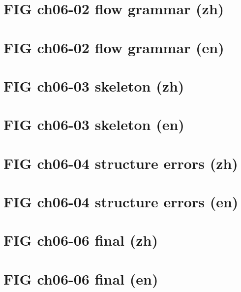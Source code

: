 \documentclass[UTF8,fontset=fandol,10pt]{ctexart}
\begin{document}
\section*{FIG ch06-02 flow grammar (zh)}
\noindent
\newpage
\section*{FIG ch06-02 flow grammar (en)}
\noindent
\newpage
\section*{FIG ch06-03 skeleton (zh)}
\noindent
\newpage
\section*{FIG ch06-03 skeleton (en)}
\noindent
\newpage
\section*{FIG ch06-04 structure errors (zh)}
\noindent
\newpage
\section*{FIG ch06-04 structure errors (en)}
\noindent
\newpage
\section*{FIG ch06-06 final (zh)}
\noindent
\newpage
\section*{FIG ch06-06 final (en)}
\noindent
\end{document}

